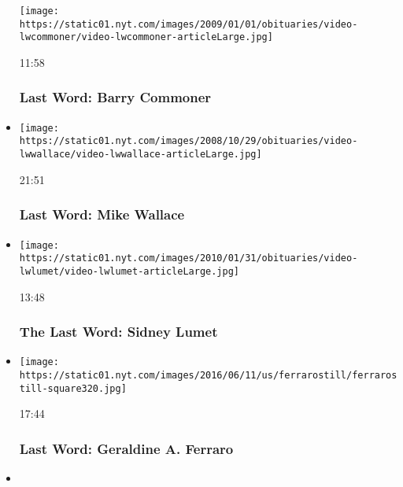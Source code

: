 \begin{itemize}
  \texttt{[image: https://static01.nyt.com/images/2009/01/01/obituaries/video-lwcommoner/video-lwcommoner-articleLarge.jpg]}

  11:58

  \hypertarget{last-word-barry-commoner}{%
  \subsubsection{Last Word: Barry
  Commoner}\label{last-word-barry-commoner}}
\item
  \href{https://www.nytimes.com/video/obituaries/1194826917764/last-word-mike-wallace.html?action=click\&module=video-series-bar\&region=header\&pgtype=Article\&playlistId=video/last-word}{}

  \texttt{[image: https://static01.nyt.com/images/2008/10/29/obituaries/video-lwwallace/video-lwwallace-articleLarge.jpg]}

  21:51

  \hypertarget{last-word-mike-wallace}{%
  \subsubsection{Last Word: Mike Wallace}\label{last-word-mike-wallace}}
\item
  \href{https://www.nytimes.com/video/obituaries/1194838961597/lwlumet.html?action=click\&module=video-series-bar\&region=header\&pgtype=Article\&playlistId=video/last-word}{}

  \texttt{[image: https://static01.nyt.com/images/2010/01/31/obituaries/video-lwlumet/video-lwlumet-articleLarge.jpg]}

  13:48

  \hypertarget{the-last-word-sidney-lumet}{%
  \subsubsection{The Last Word: Sidney
  Lumet}\label{the-last-word-sidney-lumet}}
\item
  \href{https://www.nytimes.com/video/obituaries/1194826919047/lwferraro.html?action=click\&module=video-series-bar\&region=header\&pgtype=Article\&playlistId=video/last-word}{}

  \texttt{[image: https://static01.nyt.com/images/2016/06/11/us/ferrarostill/ferrarostill-square320.jpg]}

  17:44

  \hypertarget{last-word-geraldine-a-ferraro}{%
  \subsubsection{Last Word: Geraldine A.
  Ferraro}\label{last-word-geraldine-a-ferraro}}
\item
  \href{https://www.nytimes.com/video/obituaries/1247464008751/last-word-bob-feller.html?action=click\&module=video-series-bar\&region=header\&pgtype=Article\&playlistId=video/last-word}{}


\end{itemize}

